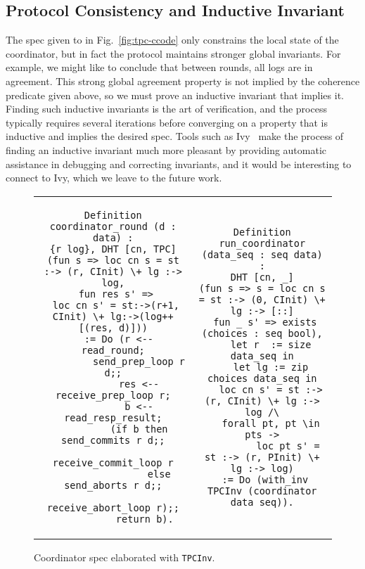 \subsection{Protocol Consistency and Inductive Invariant}
\label{sec:cons-induct-invar}

The spec given to  in Fig.~\ref{fig:tpc-ccode}
only constrains the local state  of the coordinator, but
in fact the protocol maintains stronger global invariants.
%
For example, we might like to conclude that between rounds, all logs
are in agreement.
%
This strong global agreement property is not implied by the coherence
predicate given above, so we must prove an inductive invariant that
implies it.
%
Finding such inductive invariants is the art of verification, and the
process typically requires several iterations before converging on a
property that is inductive and implies the desired spec.
%
Tools such as Ivy~\cite{Padon-al:PLDI16} make the process of finding
an inductive invariant much more pleasant by providing automatic
assistance in debugging and correcting invariants, and it would be
interesting to connect \disel to Ivy, which we leave to the future work.

{
\setlength{\belowcaptionskip}{-10pt}
\begin{figure}
\centering
\begin{tabular}{@{\!\!}c@{\ }c}
\begin{minipage}{0.5\linewidth}
\begin{lstlisting}[basicstyle=\scriptsize\ttfamily]
Definition coordinator_round (d : data) :
{r log}, DHT [cn, TPC]
(fun s => loc cn s = st :-> (r, CInit) \+ lg :-> log,
 fun res s' =>
 loc cn s' = st:->(r+1, CInit) \+ lg:->(log++[(res, d)]))
  := Do (r <-- read_round;
         send_prep_loop r d;;
         res <-- receive_prep_loop r;
         b <-- read_resp_result;
         (if b then send_commits r d;;
                     receive_commit_loop r
                else send_aborts r d;;
                     receive_abort_loop r);;
           return b).
\end{lstlisting}
\vspace{-10pt}
\caption{Spec and code of a coordinator round.}
\label{fig:tpc-ccode}
\end{minipage}
&
\setlength{\belowcaptionskip}{-10pt}
\begin{minipage}{0.5\linewidth}
\begin{lstlisting}[basicstyle=\scriptsize\ttfamily]
Definition run_coordinator (data_seq : seq data) :
DHT [cn, _]
(fun s => s = loc cn s = st :-> (0, CInit) \+ lg :-> [::]
 fun _ s' => exists (choices : seq bool),
   let r  := size data_seq in
   let lg := zip choices data_seq in
   loc cn s' = st :-> (r, CInit) \+ lg :-> log /\
   forall pt, pt \in pts ->
         loc pt s' = st :-> (r, PInit) \+ lg :-> log)
 := Do (with_inv TPCInv (coordinator data_seq)).
\end{lstlisting}
\vspace{25pt}
\caption{Coordinator spec elaborated with {\small\texttt{{TPCInv}}}.}
\label{fig:tpc-with-inv}
\end{minipage}
\end{tabular}
\end{figure}
}



